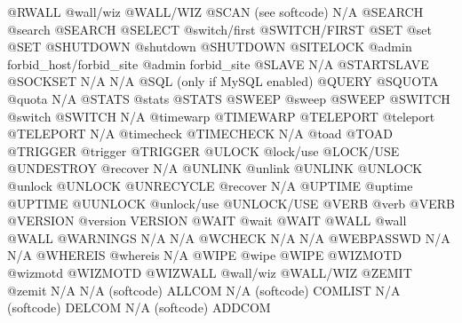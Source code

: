 \documentclass[letterpaper,10pt,english]{sphinxmanual}
\begin{document}
\begin{description}
@RWALL                  @wall/wiz                      @WALL/WIZ
@SCAN                   (see softcode)                 N/A
@SEARCH                 @search                        @SEARCH
@SELECT                 @switch/first                  @SWITCH/FIRST
@SET                    @set                           @SET
@SHUTDOWN               @shutdown                      @SHUTDOWN
@SITELOCK               @admin forbid\_host/forbid\_site @admin forbid\_site
@SLAVE                  N/A                            @STARTSLAVE
@SOCKSET                N/A                            N/A
@SQL                    (only if MySQL enabled)        @QUERY
@SQUOTA                 @quota                         N/A
@STATS                  @stats                         @STATS
@SWEEP                  @sweep                         @SWEEP
@SWITCH                 @switch                        @SWITCH
N/A                     @timewarp                      @TIMEWARP
@TELEPORT               @teleport                      @TELEPORT
N/A                     @timecheck                     @TIMECHECK
N/A                     @toad                          @TOAD
@TRIGGER                @trigger                       @TRIGGER
@ULOCK                  @lock/use                      @LOCK/USE
@UNDESTROY              @recover                       N/A
@UNLINK                 @unlink                        @UNLINK
@UNLOCK                 @unlock                        @UNLOCK
@UNRECYCLE              @recover                       N/A
@UPTIME                 @uptime                        @UPTIME
@UUNLOCK                @unlock/use                    @UNLOCK/USE
@VERB                   @verb                          @VERB
@VERSION                @version                       VERSION
@WAIT                   @wait                          @WAIT
@WALL                   @wall                          @WALL
@WARNINGS               N/A                            N/A
@WCHECK                 N/A                            N/A
@WEBPASSWD              N/A                            N/A
@WHEREIS                @whereis                       N/A
@WIPE                   @wipe                          @WIPE
@WIZMOTD                @wizmotd                       @WIZMOTD
@WIZWALL                @wall/wiz                      @WALL/WIZ
@ZEMIT                  @zemit                         N/A
N/A                     (softcode)                     ALLCOM
N/A                     (softcode)                     COMLIST
N/A                     (softcode)                     DELCOM
N/A                     (softcode)                     ADDCOM

\end{description}
\end{document}
